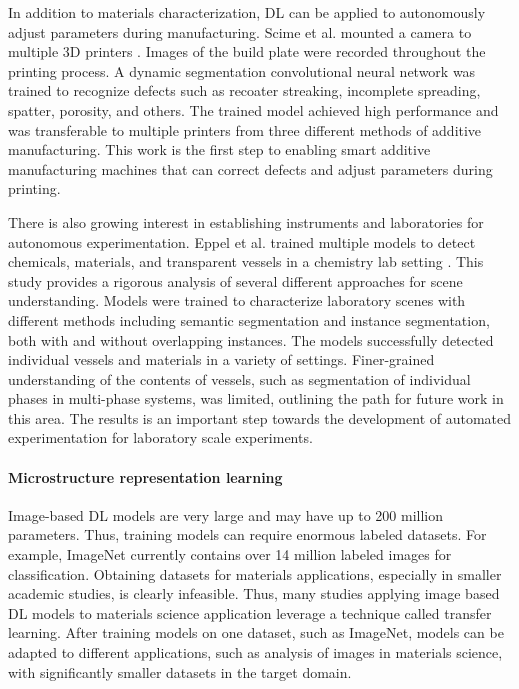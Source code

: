 \documentclass[pdflatex,sn-mathphys]{sn-jnl}%
\theoremstyle{thmstyleone}%
\theoremstyle{thmstyletwo}%
\theoremstyle{thmstylethree}%
\begin{document}
In addition to materials characterization, DL can be applied to autonomously adjust parameters during manufacturing. Scime et al. mounted a camera to multiple 3D printers  \cite{Scime2020}. Images of the build plate were recorded throughout the printing process. A dynamic segmentation convolutional neural network was trained to recognize defects such as recoater streaking, incomplete spreading, spatter, porosity, and others. The trained model achieved high performance and was transferable to multiple printers from three different methods of additive manufacturing. This work is the first step to enabling smart additive manufacturing machines that can correct defects and adjust parameters during printing.

There is also growing interest in establishing instruments and laboratories for autonomous experimentation. Eppel et al. trained multiple models to detect chemicals, materials, and transparent vessels in a chemistry lab setting \cite{eppel2020}.  This study provides a rigorous analysis of several different approaches for scene understanding. Models were trained to characterize laboratory scenes with different methods including semantic segmentation and instance segmentation, both with and without overlapping instances. The models successfully detected individual vessels and materials in a variety of settings. Finer-grained understanding of the contents of vessels, such as segmentation of individual phases in multi-phase systems, was limited, outlining the path for future work in this area. The results is an important step towards the development of automated experimentation for laboratory scale experiments. 

 
 
 

\paragraph{Microstructure representation learning}

Image-based DL models are very large and may have up to 200 million parameters. Thus, training models can require enormous labeled datasets. For example, ImageNet \cite{Russakovsky2015} currently contains over 14 million labeled images for classification.  Obtaining datasets for materials applications, especially in smaller academic studies, is clearly infeasible. Thus, many studies applying image based DL models to materials science application leverage a technique called transfer learning. After training models on one dataset, such as ImageNet, models can be adapted to different applications, such as  analysis of images in materials science, with significantly smaller datasets in the target domain.
\end{document}
